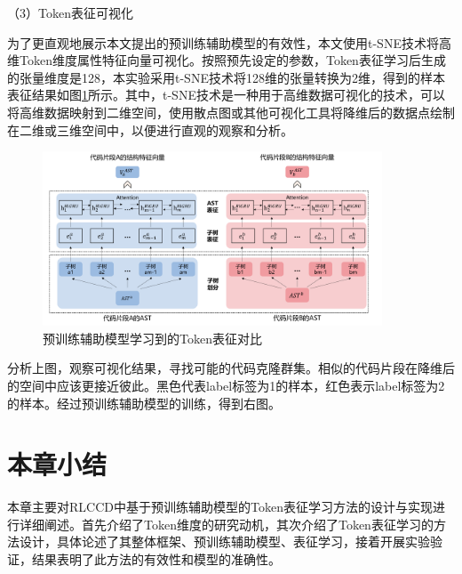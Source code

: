 （3）Token表征可视化

为了更直观地展示本文提出的预训练辅助模型的有效性，本文使用t-SNE技术将高维Token维度属性特征向量可视化。按照预先设定的参数，Token表征学习后生成的张量维度是128，本实验采用t-SNE技术将128维的张量转换为2维，得到的样本表征结果如图\ref{fig:tokenresult}所示。其中，t-SNE技术是一种用于高维数据可视化的技术，可以将高维数据映射到二维空间，使用散点图或其他可视化工具将降维后的数据点绘制在二维或三维空间中，以便进行直观的观察和分析。

\begin{figure}[H]
  \centering
  \includegraphics[width=0.9\textwidth]{figures/token}
  \caption{预训练辅助模型学习到的Token表征对比}\label{fig:tokenresult}
\end{figure}

分析上图，观察可视化结果，寻找可能的代码克隆群集。相似的代码片段在降维后的空间中应该更接近彼此。黑色代表label标签为1的样本，红色表示label标签为2的样本。经过预训练辅助模型的训练，得到右图。

\section{本章小结}
\label{sec:Summary3}
本章主要对RLCCD中基于预训练辅助模型的Token表征学习方法的设计与实现进行详细阐述。首先介绍了Token维度的研究动机，其次介绍了Token表征学习的方法设计，具体论述了其整体框架、预训练辅助模型、表征学习，接着开展实验验证，结果表明了此方法的有效性和模型的准确性。

